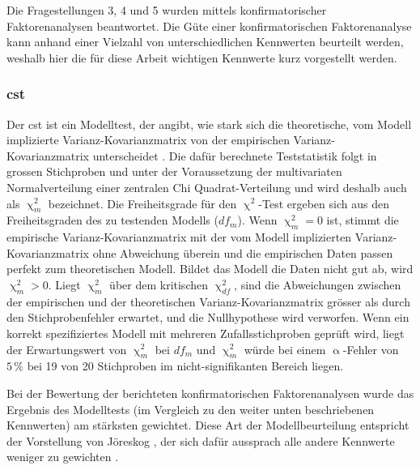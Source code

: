 \documentclass[11pt, twoside, a4paper]{book}		%
\begin{document}
Die Fragestellungen 3, 4 und 5 wurden mittels konfirmatorischer Faktorenanalysen beantwortet. Die Güte einer konfirmatorischen Faktorenanalyse kann anhand einer Vielzahl von unterschiedlichen Kennwerten beurteilt werden, weshalb hier die für diese Arbeit wichtigen Kennwerte kurz vorgestellt werden.










\subsubsection*{\gls{cst}}

Der \gls{cst} ist ein Modelltest, der angibt, wie stark sich die theoretische, vom Modell implizierte Var\-ianz-Ko\-var\-ianz\-ma\-trix von der empirischen Var\-ianz-Ko\-var\-ianz\-ma\-trix unterscheidet \citep{Kline2011}. Die dafür berechnete Teststatistik folgt in grossen Stichproben und unter der Voraussetzung der multivariaten Normalverteilung einer zentralen Chi Quad\-rat-Ver\-teil\-ung und wird deshalb auch als $\upchi^2_{m}$ bezeichnet. Die Freiheitsgrade für den $\upchi^2$-Test ergeben sich aus den Freiheitsgraden des zu testenden Modells ($df_{m}$). Wenn $\upchi^2_{m}=0$ ist, stimmt die empirische Var\-ianz-Ko\-var\-ianz\-ma\-trix mit der vom Modell implizierten Varianz-Kovarianzmatrix ohne Abweichung überein und die empirischen Daten passen perfekt zum theoretischen Modell. Bildet das Modell die Daten nicht gut ab, wird $\upchi^2_{m}>0$. Liegt $\upchi^2_{m}$ über dem kritischen $\upchi^2_{df}$, sind die Abweichungen zwischen der empirischen und der theoretischen Varianz-Kovarianzmatrix grösser als durch den Stichprobenfehler erwartet, und die Nullhypothese wird verworfen. Wenn ein korrekt spezifiziertes Modell mit mehreren Zufallsstichproben geprüft wird, liegt der Erwartungswert von $\upchi^2_{m}$ bei $df_{m}$ und $\upchi^2_{m}$ würde bei einem $\upalpha$-Fehler von $5\,\%$ bei 19 von 20 Stichproben im nicht-signifikanten Bereich liegen.

Bei der Bewertung der berichteten konfirmatorischen Faktorenanalysen wurde das Ergebnis des Modelltests (im Vergleich zu den weiter unten beschriebenen Kennwerten) am stärksten gewichtet. Diese Art der Modellbeurteilung entspricht der Vorstellung von Jöreskog \citep[1985, zitiert nach][S. 1620]{McIntosh2012}, der sich dafür aussprach alle andere Kennwerte weniger zu gewichten \citep[siehe auch][]{Hayduk2007}.
\end{document}
